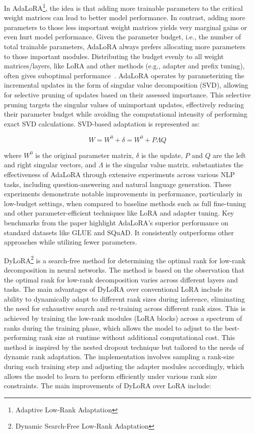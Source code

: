 In AdaLoRA\footnote{Adaptive Low-Rank Adaptation}, the idea is that adding more trainable parameters to the critical weight matrices can lead to better model performance.
In contrast, adding more parameters to those less important weight matrices yields very marginal gains or even hurt model performance.
Given the parameter budget, i.e., the number of total trainable parameters, AdaLoRA always prefers allocating more parameters to those important modules.
Distributing the budget evenly to all weight matrices/layers, like LoRA and other methods (e.g., adapter and prefix
tuning), often gives suboptimal performance~\cite{zhang2023adalora}.
AdaLoRA operates by parameterizing the incremental updates in the form of singular value decomposition (SVD), allowing for selective pruning of updates based on their assessed importance.
This selective pruning targets the singular values of unimportant updates, effectively reducing their parameter budget while avoiding the computational intensity of performing exact SVD calculations.
SVD-based adaptation is represented as:

\begin{equation}
	W = W^{0} + \delta = W^{0} + P \Lambda Q
	\label{eq:svd-adaptation}
\end{equation}

\noindent where $W^{0}$ is the original parameter matrix, $\delta$ is the update, $P$ and $Q$ are the left and right singular vectors, and $\Lambda$ is the singular value matrix.
\textcite{zhang2023adalora} substantiates the effectiveness of AdaLoRA through extensive experiments across various NLP tasks, including question-answering and natural language generation.
These experiments demonstrate notable improvements in performance, particularly in low-budget settings, when compared to baseline methods such as full fine-tuning and other parameter-efficient techniques like LoRA and adapter tuning.
Key benchmarks from the paper highlight AdaLoRA's superior performance on standard datasets like GLUE and SQuAD. It consistently outperforms other approaches while utilizing fewer parameters.

DyLoRA\footnote{Dynamic Search-Free Low-Rank Adaptation} is a search-free method for determining the optimal rank for low-rank decomposition in neural networks.
The method is based on the observation that the optimal rank for low-rank decomposition varies across different layers and tasks.
The main advantages of DyLoRA over conventional LoRA include its ability to dynamically adapt to different rank sizes during inference, eliminating the need for exhaustive search and re-training across different rank sizes.
This is achieved by training the low-rank modules (LoRA blocks) across a spectrum of ranks during the training phase, which allows the model to adjust to the best-performing rank size at runtime without additional computational cost.
This method is inspired by the nested dropout technique but tailored to the needs of dynamic rank adaptation.
The implementation involves sampling a rank-size during each training step and adjusting the adapter modules accordingly, which allows the model to learn to perform efficiently under various rank size constraints.
The main improvements of DyLoRA over LoRA include:

